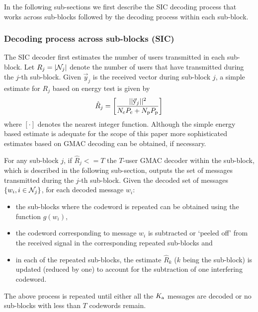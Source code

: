 In the following sub-sections we first describe the SIC decoding process that works across sub-blocks followed by the decoding process within each sub-block.

\subsubsection{Decoding process across sub-blocks (SIC)}
The SIC decoder first estimates the number of users transmitted in each sub-block. Let $R_j=|\mathcal{N}_j|$ denote the number of users that have transmitted during the $j$-th sub-block. Given $\vec{y}_j$ is the received vector during sub-block $j$, a simple estimate for $R_j$ based on energy test is given by %
\begin{align*}
\hat{R}_{j}= \left[\frac{||\vec{\mathrm{y}}_j||^2}{N_{\mathrm{c}}P_{\mathrm{c}}+N_{\mathrm{p}}P_{\mathrm{p}}}\right]
\end{align*} 
where $[\cdot ]$ denotes the nearest integer function. Although the simple energy based estimate is adequate for the scope of this paper more sophisticated estimates based on GMAC decoding can be obtained, if necessary. 

For any sub-block $j$, if $\hat{R}_{j}<=T$ the $T$-user GMAC decoder within the sub-block, which is described in the following sub-section, outputs the set of messages transmitted during the $j$-th sub-block. Given the decoded set of messages $\{w_i, i \in \mathcal{N}_j\}$, for each decoded message $w_i$:
\begin{itemize}
\item the sub-blocks where the codeword is repeated can be obtained using the function $g(w_i)$,
\item  the codeword corresponding to message $w_i$ is subtracted or `peeled off' from the received signal in the corresponding repeated sub-blocks and
\item  in each of the repeated sub-blocks, the estimate $\hat{R}_k$ ($k$ being the sub-block) is updated (reduced by one) to account for the subtraction of one interfering codeword.
\end{itemize} 
The above process is repeated until either all the $K_{\text{a}}$ messages are decoded or no sub-blocks with less than $T$ codewords remain.\\

